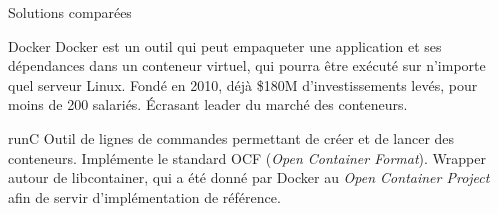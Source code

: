 \begin{frame}{Solutions comparées}
    \begin{block}{Docker}
        Docker est un outil qui peut empaqueter une application et ses dépendances dans un conteneur virtuel, qui pourra être exécuté sur n'importe quel serveur Linux. Fondé en 2010, déjà \$180M d'investissements levés, pour moins de 200 salariés. Écrasant leader du marché des conteneurs.
    \end{block}

    \begin{block}{runC}
        Outil de lignes de commandes permettant de créer et de lancer des conteneurs. Implémente le standard OCF (\textit{Open Container Format}). Wrapper autour de libcontainer, qui a été donné par Docker au \textit{Open Container Project} afin de servir d'implémentation de référence.
    \end{block}
\end{frame}
